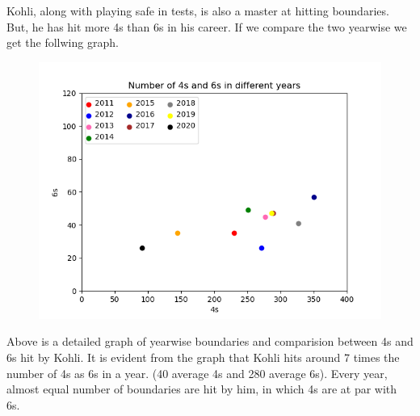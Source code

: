 \documentclass[12pt]{article}
\begin{document}
     Kohli, along with playing safe in tests, is also a master at hitting boundaries. But, he has hit more 4s than 6s in his career. If we compare the two yearwise we get the follwing graph.
    \begin{figure}[h]
    \begin{center}
    \includegraphics[width=1\linewidth]{assign/Scatter.png}
    \end{center}
    \end{figure}
    \rule{0mm}{20mm}
    Above is a detailed graph of yearwise boundaries and comparision between 4s and 6s hit by Kohli. It is evident from the graph that Kohli hits around 7 times the number of 4s as 6s in a year. (40 average 4s and 280 average 6s). Every year, almost equal number of boundaries are hit by him, in which 4s are at par with 6s.
\newpage



\newpage


 
\end{document}

